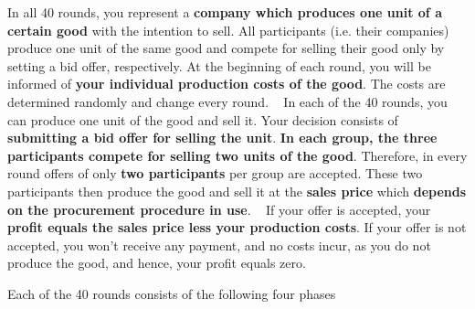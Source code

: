\documentclass[11pt]{article}
\begin{document}

In all 40 rounds, you represent a \textbf{company which produces one unit of a certain good} with the intention to sell. All participants (i.e. their companies) produce one unit of the same good and compete for selling their good only by setting a bid offer, respectively. At the beginning of each round, you will be informed of \textbf{your individual production costs of the good}. The costs are determined randomly and change every round. ~\bigbreak
In each of the 40 rounds, you can produce one unit of the good and sell it. Your decision consists of \textbf{submitting a bid offer for selling the unit}. \textbf{In each group, the three participants compete for selling two units of the good}. Therefore, in every round offers of only \textbf{two participants} per group are accepted. These two participants then produce the good and sell it at the \textbf{sales price} which \textbf{depends on the procurement procedure in use}. ~\bigbreak
If your offer is accepted, your \textbf{profit equals the sales price less your production costs}. If your offer is not accepted, you won't receive any payment, and no costs incur, as you do not produce the good, and hence, your profit equals zero.



Each of the 40 rounds consists of the following four phases
\end{document}

